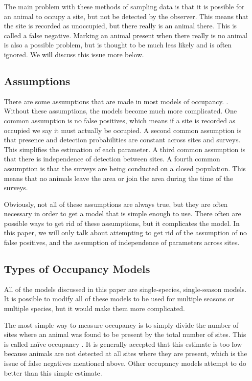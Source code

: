 \documentclass[12pt]{article}
\begin{document}
    The main problem with these methods of sampling data is that it is possible
    for an animal to occupy a site, but not be detected by the observer. This
    means that the site is recorded as unoccupied, but there really is an animal
    there. This is called a false negative. Marking an animal present when there
    really is no animal is also a possible problem, but is thought to be much
    less likely and is often ignored. We will discuss this issue more below.

    \subsection{Assumptions}
    There are some assumptions that are made in most models of occupancy.
    \cite{MacKenzie2006}. Without these assumptions, the models become much more
    complicated. One common assumption is no false positives, which means if a
    site is recorded as occupied we say it must actually be occupied. A second
    common assumption is that presence and detection probabilities are constant
    across sites and surveys. This simplifies the estimation of each parameter.
    A third common assumption is that there is independence of detection between
    sites. A fourth common assumption is that the surveys are being conducted on
    a closed population. This means that no animals leave the area or join the
    area during the time of the surveys.

    Obviously, not all of these assumptions are always true, but they are often
    necessary in order to get a model that is simple enough to use. There often
    are possible ways to get rid of these assumptions, but it complicates the
    model. In this paper, we will only talk about attempting to get rid of the
    assumption of no false positives, and the assumption of independence of
    parameters across sites.

    \subsection{Types of Occupancy Models}
    All of the models discussed in this paper are single-species, single-season
    models. It is possible to modify all of these models to be used for multiple
    seasons or multiple species, but it would make them more complicated.

    The most simple way to measure occupancy is to simply divide the number of
    sites where an animal was found to be present by the total number of sites.
    This is called na\"ive occupancy \cite{MacKenzie2006}. It is generally
    accepted that this estimate is too low because animals are not detected at
    all sites where they are present, which is the issue of false negatives
    mentioned above. Other occupancy models attempt to do better than this
    simple estimate.
\end{document}
